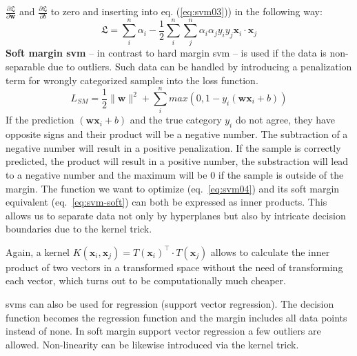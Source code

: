 $\frac{\partial \mathfrak{L}}{\partial \mathbf{w}}$ and $\frac{\partial \mathfrak{L}}{\partial b}$ 
to zero and inserting into eq. (\ref{eq:svm03}))\cite{winston1992artificial,cherkassky1998learning} in the following way: 
\begin{equation}
	\label{eq:svm04}
	\mathfrak{L} = \sum_i^n \alpha_i - \frac{1}{2} \sum_i^n \sum_j^n \alpha_i \alpha_j y_i y_j \mathbf{x}_i \cdot \mathbf{x}_j 
\end{equation}
%
\textbf{Soft margin \gls{svm}} -- in contrast to hard margin \gls{svm} -- is used if the data is non-separable due to outliers\cite{cortes1995support}.
Such data can be handled by introducing a penalization term for wrongly categorized samples into the loss function. 
\begin{equation}
	\label{eq:svm-soft}
	L_{SM} = \frac{1}{2} \|\mathbf{w}\|^2 + \sum_i^n max \left( 0, 1- y_i ( \mathbf{w} \mathbf{x}_i + b ) \right) 
\end{equation}
If the prediction $(\mathbf{w}\mathbf{x}_i+b)$ and the true category $y_i$ do not agree, 
they have opposite signs and their product will be a negative number.
The subtraction of a negative number will result in a positive penalization. 
If the sample is correctly predicted, the product will result in a positive number, 
the substraction will lead to a negative number and the maximum will be 0 if the sample is outside of the margin. 
%
The function we want to optimize (eq.~\ref{eq:svm04}) and its soft margin equivalent (eq.~\ref{eq:svm-soft}) can both be expressed as inner products. 
This allows us to separate data not only by hyperplanes 
but also by intricate decision boundaries due to the kernel trick. 

Again, a kernel $K(\mathbf{x}_i, \mathbf{x}_j) = T(\mathbf{x}_i)^\top \cdot T(\mathbf{x}_j)$ allows to calculate the inner product of two vectors in a transformed space without the need of transforming each vector, which turns out to be computationally much cheaper. 

\Gls{svm}s can also be used for regression (support vector regression).
The decision function becomes the regression function and the margin includes all data points instead of none. 
In soft margin support vector regression a few
outliers are allowed.
Non-linearity can be likewise introduced via the kernel trick. 

